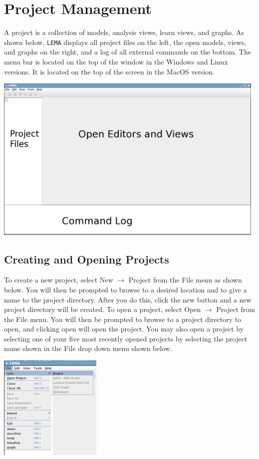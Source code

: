 \documentclass[titlepage,11pt]{article}
\begin{document}
\section{Project Management}

\noindent
A project is a collection of models, analysis views, learn
views, and graphs.  As shown below, {\tt LEMA} displays all project
files on the left, the open models, views, and graphs on the
right, and a log of all external commands on the bottom.
The menu bar is located on the top of the window in the Windows and
Linux versions.  It is located on the top of the screen in the MacOS version.
\begin{center}
\includegraphics[height=80mm]{screenshots/LEMA}
\end{center}

\subsection{Creating and Opening Projects}

\noindent
To create a new project, select New $\rightarrow$ Project from the File
menu as shown below. You will then be prompted to browse to a desired location
and to give a name to the project directory. After you do this,
click the new button and a new project directory will be created.
To open a project, select Open $\rightarrow$ Project from the File menu.
You will then be prompted to browse to a project directory to
open, and clicking open will open the project. You may also open
a project by selecting one of your five most recently opened
projects by selecting the project name shown in the File drop
down menu shown below. 
\begin{center}
\includegraphics[height=50mm]{screenshots/projectLema}
\end{center}
\end{document}
